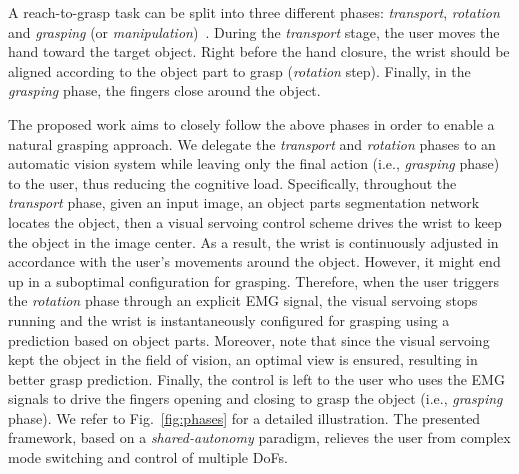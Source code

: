 A reach-to-grasp task can be split into three different phases: \textit{transport}, \textit{rotation} and \textit{grasping} (or \textit{manipulation})~\cite{gentilucci1991}. During the \textit{transport} stage, the user moves the hand toward the target object. Right before the hand closure, the wrist should be aligned according to the object part to grasp (\textit{rotation} step). Finally, in the \textit{grasping} phase, the fingers close around the object. 

The proposed work aims to closely follow the above phases in order to enable a natural grasping approach. We delegate the \textit{transport} and \textit{rotation} phases to an automatic vision system while leaving only the final action (i.e., \textit{grasping} phase) to the user, thus reducing the cognitive load. 
Specifically, throughout the \textit{transport} phase, given an input image, an object parts segmentation network locates the object, then a visual servoing control scheme drives the wrist to keep the object in the image center. As a result, the wrist is continuously adjusted in accordance with the user's movements around the object. However, it might end up in a suboptimal configuration for grasping. Therefore, when the user triggers the \textit{rotation} phase through an explicit EMG signal, the visual servoing stops running and the wrist is instantaneously configured for grasping using a prediction based on object parts. Moreover, note that since the visual servoing kept the object in the field of vision, an optimal view is ensured, resulting in better grasp prediction. Finally, the control is left to the user who uses the EMG signals to drive the fingers opening and closing to grasp the object (i.e., \textit{grasping} phase). We refer to Fig.~\ref{fig:phases} for a detailed illustration.
The presented framework, based on a \textit{shared-autonomy} paradigm, relieves the user from complex mode switching and control of multiple DoFs. 

